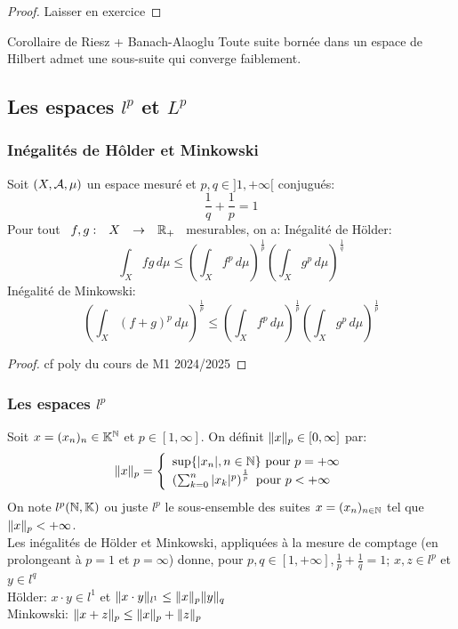 \documentclass[]{report}
\begin{document}
    \begin{proof}
        Laisser en exercice
    \end{proof}

    \begin{cor}{Corollaire de Riesz + Banach-Alaoglu}{}
        Toute suite bornée dans un espace de Hilbert admet une sous-suite qui converge faiblement.
    \end{cor}

    \subsection*{Les espaces $l^p$ et $L^p$}

    \subsubsection*{Inégalités de Hôlder et Minkowski}

    Soit $(X,\mathcal{A},\mu)$ un espace mesuré et $p,q\in ]1,+\infty[$ conjugués:
    \[\frac{1}{q}+\frac{1}{p}=1\]
    Pour tout $\begin{array}{ccccc} f,g : & X & \to & \mathbb{R}_+ \end{array}$ mesurables, on a: Inégalité de Hölder:
    \[\int_X fg\,d\mu \le \left(\int_X f^p \,d\mu\right)^{\frac{1}{p}}\left(\int_X g^p\,d\mu\right)^{\frac{1}{q}}\]
    Inégalité de Minkowski:
    \[\left(\int_X (f+g)^p\,d\mu\right)^{\frac{1}{p}}\le \left(\int_X f^p\,d\mu\right)^{\frac{1}{p}}\left(\int_X g^p\,d\mu\right)^{\frac{1}{p}}\]

    \begin{proof}
        cf poly du cours de M1 2024/2025
    \end{proof}

    \subsubsection*{Les espaces $l^p$}

    Soit $x=(x_n)_n\in \mathbb{K}^{\mathbb{N}}$ et $p\in [1,\infty]$. On définit $\lVert x \rVert_p\in [0,\infty]$ par:
    \[\lVert x \rVert_p=\left\{\begin{array}{ll} \sup \{|x_n|,n\in \mathbb{N}\}\text{ pour $p=+\infty$}\\ \left(\sum_{k=0}^{n}|x_k|^p\right)^{\frac{1}{p}}\text{ pour $p<+\infty$} \end{array} \right.\]
    On note $l^p(\mathbb{N},\mathbb{K})$ ou juste $l^p$ le sous-ensemble des suites $x=(x_n)_{n\in\mathbb{N}}$ tel que $\lVert x \rVert_p<+\infty$.\\
    Les inégalités de Hölder et Minkowski, appliquées à la mesure de comptage (en prolongeant à $p=1$ et $p=\infty$) donne, pour $p,q\in [1,+\infty],\frac{1}{p}+\frac{1}{q}=1$; $x,z\in l^p$ et $y\in l^q$\\
    Hölder: $x \cdot y\in l^1$ et $\lVert x\cdot y \rVert_{l^1}\le \lVert x \rVert_p \lVert y \rVert_q$\\
    Minkowski: $\lVert x+z \rVert_p\le \lVert x \rVert_p +\lVert z \rVert_p$
\end{document}
